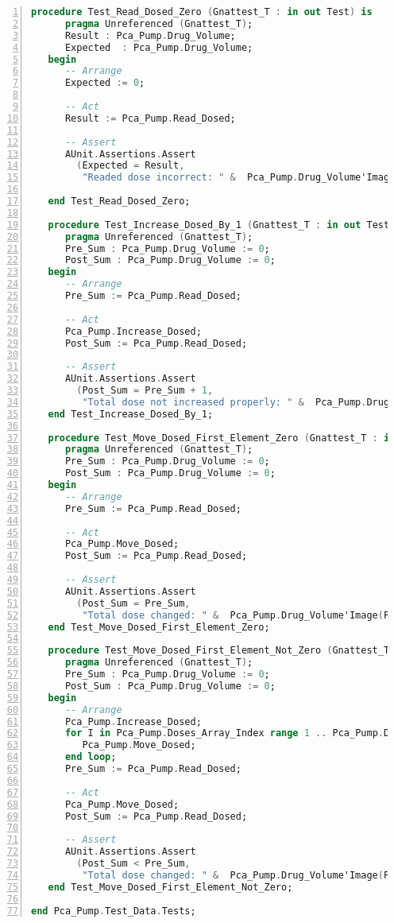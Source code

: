 \begin{lstlisting}[language=ada, gobble=0, numbers=left, caption={Package \lstinline{Pca_Pump.Test_Data.Tests}}, label={listing:pcapump:dose_monitor_module:test_data_tests}]
   procedure Test_Read_Dosed_Zero (Gnattest_T : in out Test) is
      pragma Unreferenced (Gnattest_T);
      Result : Pca_Pump.Drug_Volume;
      Expected  : Pca_Pump.Drug_Volume;
   begin
      -- Arrange
      Expected := 0;

      -- Act
      Result := Pca_Pump.Read_Dosed;

      -- Assert
      AUnit.Assertions.Assert
        (Expected = Result,
         "Readed dose incorrect: " &  Pca_Pump.Drug_Volume'Image(Expected) & " /= " &  Pca_Pump.Drug_Volume'Image(Result));

   end Test_Read_Dosed_Zero;

   procedure Test_Increase_Dosed_By_1 (Gnattest_T : in out Test) is
      pragma Unreferenced (Gnattest_T);
      Pre_Sum : Pca_Pump.Drug_Volume := 0;
      Post_Sum : Pca_Pump.Drug_Volume := 0;
   begin
      -- Arrange
      Pre_Sum := Pca_Pump.Read_Dosed;

      -- Act
      Pca_Pump.Increase_Dosed;
      Post_Sum := Pca_Pump.Read_Dosed;

      -- Assert
      AUnit.Assertions.Assert
        (Post_Sum = Pre_Sum + 1,
         "Total dose not increased properly: " &  Pca_Pump.Drug_Volume'Image(Post_Sum) & " /= " &  Pca_Pump.Drug_Volume'Image(Pre_Sum+1));
   end Test_Increase_Dosed_By_1;

   procedure Test_Move_Dosed_First_Element_Zero (Gnattest_T : in out Test) is
      pragma Unreferenced (Gnattest_T);
      Pre_Sum : Pca_Pump.Drug_Volume := 0;
      Post_Sum : Pca_Pump.Drug_Volume := 0;
   begin
      -- Arrange
      Pre_Sum := Pca_Pump.Read_Dosed;

      -- Act
      Pca_Pump.Move_Dosed;
      Post_Sum := Pca_Pump.Read_Dosed;

      -- Assert
      AUnit.Assertions.Assert
        (Post_Sum = Pre_Sum,
         "Total dose changed: " &  Pca_Pump.Drug_Volume'Image(Pre_Sum) & " /= " &  Pca_Pump.Drug_Volume'Image(Post_Sum));
   end Test_Move_Dosed_First_Element_Zero;

   procedure Test_Move_Dosed_First_Element_Not_Zero (Gnattest_T : in out Test) is
      pragma Unreferenced (Gnattest_T);
      Pre_Sum : Pca_Pump.Drug_Volume := 0;
      Post_Sum : Pca_Pump.Drug_Volume := 0;
   begin
      -- Arrange
      Pca_Pump.Increase_Dosed;
      for I in Pca_Pump.Doses_Array_Index range 1 .. Pca_Pump.Doses_Array_Index'Last-1 loop
         Pca_Pump.Move_Dosed;
      end loop;
      Pre_Sum := Pca_Pump.Read_Dosed;

      -- Act
      Pca_Pump.Move_Dosed;
      Post_Sum := Pca_Pump.Read_Dosed;

      -- Assert
      AUnit.Assertions.Assert
        (Post_Sum < Pre_Sum,
         "Total dose changed: " &  Pca_Pump.Drug_Volume'Image(Pre_Sum) & " should be greater than " &  Pca_Pump.Drug_Volume'Image(Post_Sum));
   end Test_Move_Dosed_First_Element_Not_Zero;

end Pca_Pump.Test_Data.Tests;

\end{lstlisting} 
\doublespacing